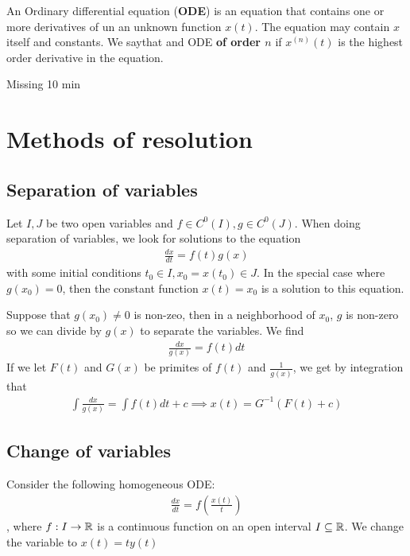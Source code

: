 
\begin{dfn}[]
  An Ordinary differential equation (\textbf{ODE}) is an equation that contains one or more derivatives of un an unknown function $x(t)$. The equation may contain $x$ itself and constants.
  We saythat and ODE \textbf{of order $n$} if $x^{(n)}(t)$ is the highest order derivative in the equation.
\end{dfn}


\begin{center}
Missing 10 min
\end{center}


\section{Methods of resolution}
\subsection{Separation of variables}
Let $I,J$ be two open variables and $f \in C^0(I), g \in C^0(J)$. When doing separation of variables, we look for solutions to the equation
\begin{align*}
  \frac{d x}{d t} = f(t)g(x)
\end{align*}
with some initial conditions $t_0 \in I, x_0 = x(t_0) \in J$.
In the special case where $g(x_0) = 0$, then the constant function $x(t) = x_0$ is a solution to this equation.

Suppose that $g(x_0) \neq 0$ is non-zeo, then in a neighborhood of $x_0$, $g$ is non-zero so we can divide by $g(x)$ to separate the variables. We find
\begin{align*}
  \frac{dx}{g(x)} = f(t) dt
\end{align*}
If we let $F(t)$ and $G(x)$ be primites of $f(t)$ and $\frac{1}{g(x)}$, we get by integration that
\begin{align*}
  \int \frac{dx}{g(x)} = \int f(t) dt + c \implies x(t) = G^{-1}(F(t) + c)
\end{align*}

\subsection{Change of variables}
Consider the following homogeneous ODE:
\begin{align*}
  \frac{d x}{d t} = f \left(
    \frac{x(t)}{t}
  \right)
\end{align*}
, where $f: I \to \mathbb{R}$ is a continuous function on an open interval $I \subseteq \mathbb{R}$.
We change the variable to $x(t) = t y(t)$


